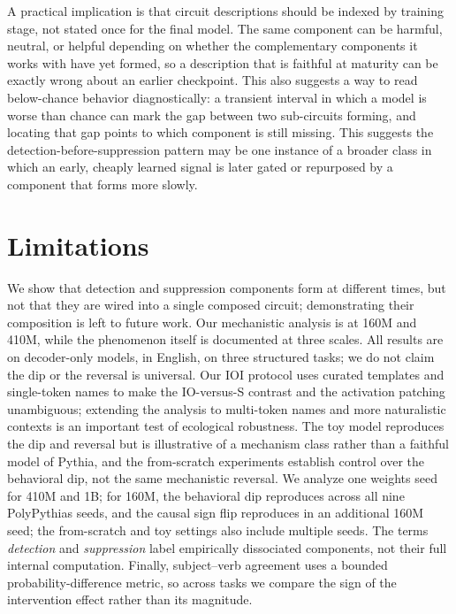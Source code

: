 \documentclass[11pt]{article}
\begin{document}
A practical implication is that circuit descriptions should be indexed by
training stage, not stated once for the final model. The same component can be
harmful, neutral, or helpful depending on whether the complementary components it
works with have yet formed, so a description that is faithful at maturity can be
exactly wrong about an earlier checkpoint. This also suggests a way to read
below-chance behavior diagnostically: a transient interval in which a model is
worse than chance can mark the gap between two sub-circuits forming, and
locating that gap points to which component is still missing. This suggests the
detection-before-suppression pattern may be one instance of a broader class in
which an early, cheaply learned signal is later gated or repurposed by a
component that forms more slowly.

\section*{Limitations}
We show that detection and suppression components form at different times, but
not that they are wired into a single composed circuit; demonstrating their
composition is left to future work. Our mechanistic analysis is at 160M and 410M,
while the phenomenon itself is documented at three scales. All results are on
decoder-only models, in English, on three structured tasks; we do not claim the
dip or the reversal is universal. Our IOI protocol uses curated templates and
single-token names to make the IO-versus-S contrast and the activation patching
unambiguous; extending the analysis to multi-token names and more naturalistic
contexts is an important test of ecological robustness. The toy model reproduces the dip and reversal
but is illustrative of a mechanism class rather than a faithful model of Pythia,
and the from-scratch experiments establish control over the behavioral dip, not
the same mechanistic reversal. We analyze one weights seed for 410M and 1B; for
160M, the behavioral dip reproduces across all nine PolyPythias seeds, and the
causal sign flip reproduces in an additional 160M seed; the from-scratch and toy
settings also include multiple seeds. The terms
\emph{detection} and \emph{suppression} label empirically dissociated components,
not their full internal computation. Finally, subject--verb agreement uses a
bounded probability-difference metric, so across tasks we compare the sign of the
intervention effect rather than its magnitude.
\end{document}
